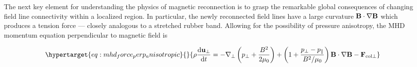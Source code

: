 \documentclass[
  notoc %
]{tufte-book}
\begin{document}
The next key element for understanding the physics of magnetic
reconnection is to grasp the remarkable global consequences of changing
field line connectivity within a localized region. In particular, the
newly reconnected field lines have a large curvature
\({\bf B}\cdot\nabla{\bf B}\) which produces a tension force --- closely
analogous to a stretched rubber band. Allowing for the possibility of
pressure anisotropy, the MHD momentum equation perpendicular to magnetic
field is

\begin{equation}\protect\hypertarget{eq:mhd_force_perp_anisotropic}{}{
\rho\frac{\mathrm{d}\mathbf{u}_\perp}{\mathrm{d}t} = -\nabla_\perp\left( p_\perp + \frac{B^2}{2\mu_0}\right) + \left( 1+\frac{p_\perp - p_\parallel}{B^2/\mu_0}\right)\mathbf{B}\cdot\nabla\mathbf{B} - \mathbf{F}_{\text{col}\perp}
}\label{eq:mhd_force_perp_anisotropic}\end{equation}
\end{document}
